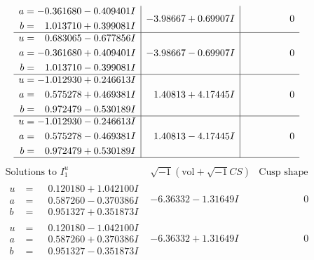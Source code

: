\documentclass[1p]{elsarticle_modified}
\theoremstyle{definition}
\newcommand{\I}{\sqrt{-1}}
\begin{document}
$$\begin{array}{c|c|c}
\begin{aligned}
a &= -0.361680 - 0.409401 I \\
b &= \phantom{-}1.013710 + 0.399081 I\end{aligned}
 & -3.98667 + 0.69907 I & \phantom{-0.000000 } 0 \\ \hline\begin{aligned}
u &= \phantom{-}0.683065 - 0.677856 I \\
a &= -0.361680 + 0.409401 I \\
b &= \phantom{-}1.013710 - 0.399081 I\end{aligned}
 & -3.98667 - 0.69907 I & \phantom{-0.000000 } 0 \\ \hline\begin{aligned}
u &= -1.012930 + 0.246613 I \\
a &= \phantom{-}0.575278 + 0.469381 I \\
b &= \phantom{-}0.972479 - 0.530189 I\end{aligned}
 & \phantom{-}1.40813 + 4.17445 I & \phantom{-0.000000 } 0 \\ \hline\begin{aligned}
u &= -1.012930 - 0.246613 I \\
a &= \phantom{-}0.575278 - 0.469381 I \\
b &= \phantom{-}0.972479 + 0.530189 I\end{aligned}
 & \phantom{-}1.40813 - 4.17445 I & \phantom{-0.000000 } 0\\
 \hline 
 \end{array}$$\newpage$$\begin{array}{c|c|c}  
\text{Solutions to }I^u_{1}& \I (\text{vol} + \sqrt{-1}CS) & \text{Cusp shape}\\
 \hline 
\begin{aligned}
u &= \phantom{-}0.120180 + 1.042100 I \\
a &= \phantom{-}0.587260 - 0.370386 I \\
b &= \phantom{-}0.951327 + 0.351873 I\end{aligned}
 & -6.36332 - 1.31649 I & \phantom{-0.000000 } 0 \\ \hline\begin{aligned}
u &= \phantom{-}0.120180 - 1.042100 I \\
a &= \phantom{-}0.587260 + 0.370386 I \\
b &= \phantom{-}0.951327 - 0.351873 I\end{aligned}
 & -6.36332 + 1.31649 I & \phantom{-0.000000 } 0 \\ \hline\begin{aligned}

\end{aligned}
\end{array}$$
\end{document}
